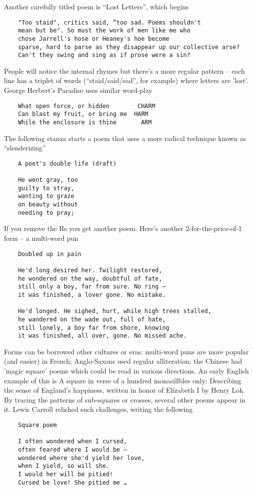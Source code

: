 \documentclass[11pt]{article}
\begin{document}
    Another carefully titled poem is ``Lost Letters'', which begins
\begin{verbatim}
    "Too staid", critics said, “too sad. Poems shouldn't
    mean but be". So must the work of men like me who
    chose Jarrell's hose or Heaney's hoe become
    sparse, hard to parse as they disappear up our collective arse?
    Can't they swing and sing as if prose were a sin?
\end{verbatim}
People will notice the internal rhymes but there's a more regular pattern – each line has a triplet of words (“staid/said/sad”, for example) where letters are 'lost'. George Herbert's Paradise uses similar word-play
\begin{verbatim}
    What open force, or hidden        CHARM
    Can blast my fruit, or bring me  HARM
    While the enclosure is thine       ARM
\end{verbatim}
The following stanza starts a poem that uses a more radical technique known as “slenderizing”
\begin{verbatim}
    A poet's double life (draft)

    He went gray, too
    guilty to stray,
    wanting to graze
    on beauty without
    needing to pray;
\end{verbatim}
If you remove the Rs you get another poem. Here’s another 2-for-the-price-of-1 form – a multi-word pun
\begin{verbatim}
    Doubled up in pain

    He'd long desired her. Twilight restored,
    he wondered on the way, doubtful of fate,
    still only a boy, far from sure. No ring –
    it was finished, a lover gone. No mistake.

    He'd longed. He sighed, hurt, while high trees stalled,
    he wandered on the wade out, full of hate,
    still lonely, a boy far from shore, knowing
    it was finished, all over, gone. No missed ache.
\end{verbatim}
Forms can be borrowed other cultures or eras: multi-word puns are more popular (and easier) in French; Anglo-Saxons used regular alliteration; the Chinese had 'magic square' poems which could be read in various directions. An early English example of this is A square in verse of a hundred monasillbles only: Describing the sense of England's happiness, written in honor of Elizabeth I by Henry Lok. By tracing the patterns of sub-squares or crosses, several other poems appear in it. Lewis Carroll relished such challenges, writing the following
\begin{verbatim}
    Square poem

    I often wondered when I cursed,
    often feared where I would be –
    wondered where she'd yield her love,
    when I yield, so will she.
    I would her will be pitied!
    Cursed be love! She pitied me …
\end{verbatim}
\end{document}

